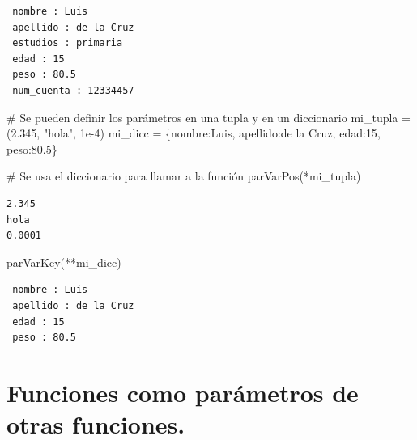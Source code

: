 \documentclass[
  spanish,
  letterpaper,
]{scrbook}
\newenvironment{Shaded}{\begin{snugshade}}{\end{snugshade}}
\newcommand{\CommentTok}[1]{\textcolor[rgb]{0.37,0.37,0.37}{#1}}
\newcommand{\DecValTok}[1]{\textcolor[rgb]{0.68,0.00,0.00}{#1}}
\newcommand{\FloatTok}[1]{\textcolor[rgb]{0.68,0.00,0.00}{#1}}
\newcommand{\NormalTok}[1]{\textcolor[rgb]{0.00,0.23,0.31}{#1}}
\newcommand{\OperatorTok}[1]{\textcolor[rgb]{0.37,0.37,0.37}{#1}}
\newcommand{\StringTok}[1]{\textcolor[rgb]{0.13,0.47,0.30}{#1}}
\theoremstyle{definition}
\theoremstyle{remark}
\begin{document}
\begin{verbatim}
 nombre : Luis
 apellido : de la Cruz
 estudios : primaria
 edad : 15
 peso : 80.5
 num_cuenta : 12334457
\end{verbatim}

\begin{Shaded}
\begin{Highlighting}[]
\CommentTok{\# Se pueden definir los parámetros en una tupla y en un diccionario}
\NormalTok{mi\_tupla }\OperatorTok{=}\NormalTok{ (}\FloatTok{2.345}\NormalTok{, }\StringTok{"hola"}\NormalTok{, }\FloatTok{1e{-}4}\NormalTok{)}
\NormalTok{mi\_dicc }\OperatorTok{=}\NormalTok{ \{}\StringTok{\textquotesingle{}nombre\textquotesingle{}}\NormalTok{:}\StringTok{\textquotesingle{}Luis\textquotesingle{}}\NormalTok{, }
           \StringTok{\textquotesingle{}apellido\textquotesingle{}}\NormalTok{:}\StringTok{\textquotesingle{}de la Cruz\textquotesingle{}}\NormalTok{, }
           \StringTok{\textquotesingle{}edad\textquotesingle{}}\NormalTok{:}\DecValTok{15}\NormalTok{, }
           \StringTok{\textquotesingle{}peso\textquotesingle{}}\NormalTok{:}\FloatTok{80.5}\NormalTok{\}}
\end{Highlighting}
\end{Shaded}

\begin{Shaded}
\begin{Highlighting}[]
\CommentTok{\# Se usa el diccionario para llamar a la función}
\NormalTok{parVarPos(}\OperatorTok{*}\NormalTok{mi\_tupla)}
\end{Highlighting}
\end{Shaded}

\begin{verbatim}
2.345
hola
0.0001
\end{verbatim}

\begin{Shaded}
\begin{Highlighting}[]
\NormalTok{parVarKey(}\OperatorTok{**}\NormalTok{mi\_dicc)}
\end{Highlighting}
\end{Shaded}

\begin{verbatim}
 nombre : Luis
 apellido : de la Cruz
 edad : 15
 peso : 80.5
\end{verbatim}

\section{Funciones como parámetros de otras
funciones.}\label{funciones-como-paruxe1metros-de-otras-funciones.}
\end{document}
